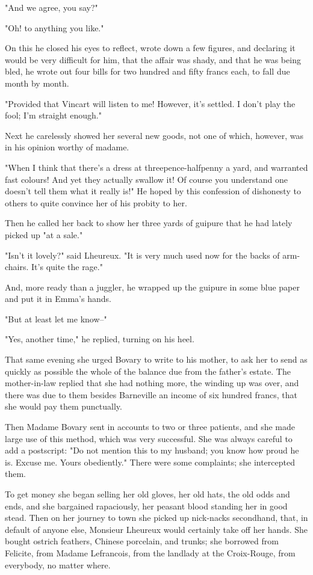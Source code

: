 \documentclass[11pt,twocolumn]{ltugboat}
\begin{document}
"And we agree, you say?"

"Oh! to anything you like."

On this he closed his eyes to reflect, wrote down a few figures, and
declaring it would be very difficult for him, that the affair was shady,
and that he was being bled, he wrote out four bills for two hundred and
fifty francs each, to fall due month by month.

"Provided that Vincart will listen to me! However, it's settled. I don't
play the fool; I'm straight enough."

Next he carelessly showed her several new goods, not one of which,
however, was in his opinion worthy of madame.

"When I think that there's a dress at threepence-halfpenny a yard, and
warranted fast colours! And yet they actually swallow it! Of course you
understand one doesn't tell them what it really is!" He hoped by this
confession of dishonesty to others to quite convince her of his probity
to her.

Then he called her back to show her three yards of guipure that he had
lately picked up "at a sale."

"Isn't it lovely?" said Lheureux. "It is very much used now for the
backs of arm-chairs. It's quite the rage."

And, more ready than a juggler, he wrapped up the guipure in some blue
paper and put it in Emma's hands.

"But at least let me know--"

"Yes, another time," he replied, turning on his heel.

That same evening she urged Bovary to write to his mother, to ask her
to send as quickly as possible the whole of the balance due from the
father's estate. The mother-in-law replied that she had nothing more,
the winding up was over, and there was due to them besides Barneville an
income of six hundred francs, that she would pay them punctually.

Then Madame Bovary sent in accounts to two or three patients, and she
made large use of this method, which was very successful. She was always
careful to add a postscript: "Do not mention this to my husband; you
know how proud he is. Excuse me. Yours obediently." There were some
complaints; she intercepted them.

To get money she began selling her old gloves, her old hats, the old
odds and ends, and she bargained rapaciously, her peasant blood standing
her in good stead. Then on her journey to town she picked up nick-nacks
secondhand, that, in default of anyone else, Monsieur Lheureux would
certainly take off her hands. She bought ostrich feathers, Chinese
porcelain, and trunks; she borrowed from Felicite, from Madame
Lefrancois, from the landlady at the Croix-Rouge, from everybody, no
matter where.
\end{document}
